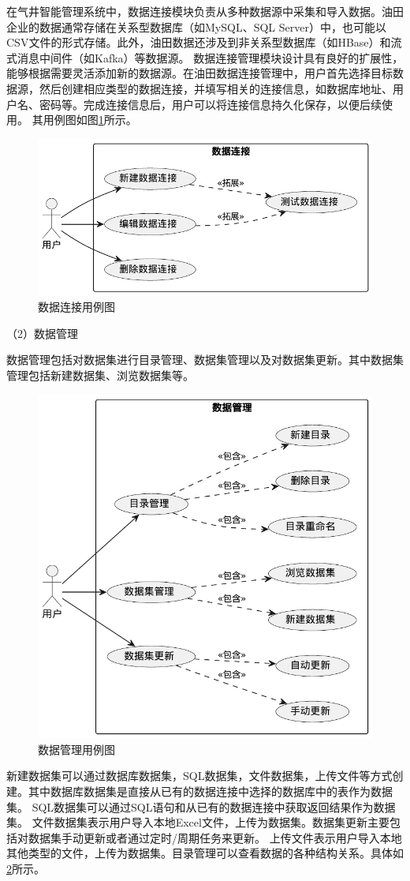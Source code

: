 在气井智能管理系统中，数据连接模块负责从多种数据源中采集和导入数据。油田企业的数据通常存储在关系型数据库（如MySQL、SQL Server）中，也可能以CSV文件的形式存储。此外，油田数据还涉及到非关系型数据库（如HBase）和流式消息中间件（如Kafka）等数据源。
数据连接管理模块设计具有良好的扩展性，能够根据需要灵活添加新的数据源。在油田数据连接管理中，用户首先选择目标数据源，然后创建相应类型的数据连接，并填写相关的连接信息，如数据库地址、用户名、密码等。完成连接信息后，用户可以将连接信息持久化保存，以便后续使用。
其用例图如图\ref{fig:dataconnectionusecase}所示。
\begin{figure}[H]
    \centering
    \caption{数据连接用例图}
    \label{fig:dataconnectionusecase}
    \includegraphics[width=.7\linewidth]{figure/数据连接用例图.pdf}
\end{figure}

（2）数据管理 

数据管理包括对数据集进行目录管理、数据集管理以及对数据集更新。其中数据集管理包括新建数据集、浏览数据集等。
\begin{figure}[h]
    \centering
    \caption{数据管理用例图}
    \label{fig:datamaucase}
    \includegraphics[width=.6\linewidth]{figure/数据管理用例图 .pdf}
\end{figure}
新建数据集可以通过数据库数据集，SQL数据集，文件数据集，上传文件等方式创建。其中数据库数据集是直接从已有的数据连接中选择的数据库中的表作为数据集。
SQL数据集可以通过SQL语句和从已有的数据连接中获取返回结果作为数据集。
文件数据集表示用户导入本地Excel文件，上传为数据集。数据集更新主要包括对数据集手动更新或者通过定时/周期任务来更新。
上传文件表示用户导入本地其他类型的文件，上传为数据集。目录管理可以查看数据的各种结构关系。具体如\ref{fig:datamaucase}所示。

